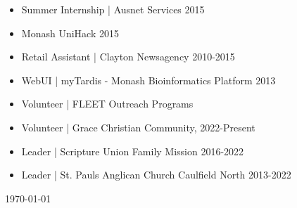 \documentclass[10pt,a4paper,ragged2e,withhyper]{altacv}
\begin{document}
	\newcommand*{\phonesym}{\color{accent}\faPhone}
	\newcommand*{\phonenumber}[1]{\href{tel:#1}{#1}}
	\newcommand*{\mailsym}{{\color{accent}\small\normalfont\mailaddresssymbol}}
	\newcommand*{\mailto}[1]{\href{mailto:#1}{#1}}
	\newcommand*{\mailtoshort}[2]{\href{mailto:#2}{#1}}
	\newcommand*{\buildingsym}{\color{accent}\faBuilding}
	\newcommand*{\LIsym}{\color{accent}\faLinkedin}
	\newcommand*{\LIprofile}[2]{\href{https://linkedin.com/in/#1}{#2}}
	
	\begin{itemize}
		\item Summer Internship | Ausnet Services 2015
		\item Monash UniHack 2015
		\item Retail Assistant | Clayton Newsagency 2010-2015
		\item WebUI | myTardis - Monash Bioinformatics Platform 2013
	\end{itemize}
	
	\begin{itemize}
		\item Volunteer | FLEET Outreach Programs
		\item Volunteer | Grace Christian Community, 2022-Present\\
		\item Leader | Scripture Union Family Mission 2016-2022\\
		\item Leader | St. Pauls Anglican Church Caulfield North 2013-2022
	\end{itemize}

\vspace{4em}


\centering
\today

\end{document}
